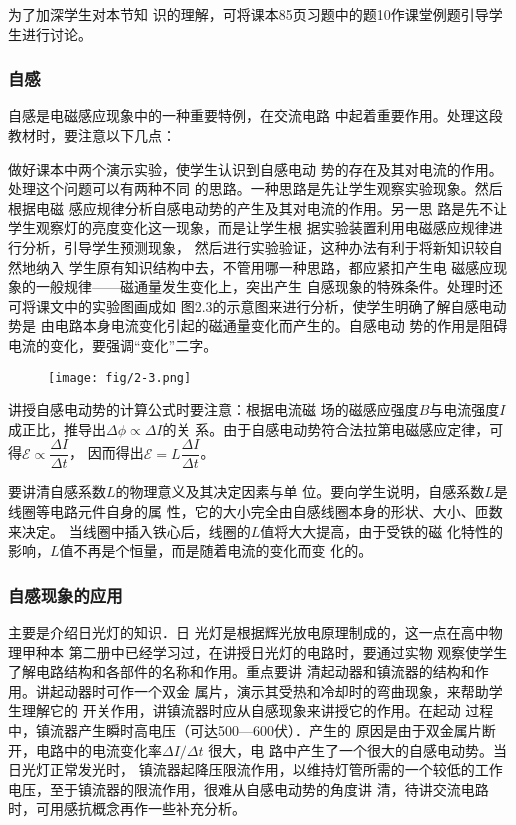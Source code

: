 为了加深学生对本节知
识的理解，可将课本85页习题中的题10作课堂例题引导学
生进行讨论。

\subsubsection{自感}
自感是电磁感应现象中的一种重要特例，在交流电路
中起着重要作用。处理这段教材时，要注意以下几点：

做好课本中两个演示实验，使学生认识到自感电动
势的存在及其对电流的作用。处理这个问题可以有两种不同
的思路。一种思路是先让学生观察实验现象。然后根据电磁
感应规律分析自感电动势的产生及其对电流的作用。另一思
路是先不让学生观察灯的亮度变化这一现象，而是让学生根
据实验装置利用电磁感应规律进行分析，引导学生预测现象，
然后进行实验验证，这种办法有利于将新知识较自然地纳入
学生原有知识结构中去，不管用哪一种思路，都应紧扣产生电
磁感应现象的一般规律——磁通量发生变化上，突出产生
自感现象的特殊条件。处理时还可将课文中的实验图画成如
图2.3的示意图来进行分析，使学生明确了解自感电动势是
由电路本身电流变化引起的磁通量变化而产生的。自感电动
势的作用是阻碍电流的变化，要强调“变化”二字。

\begin{figure}[htp]
    \centering
\texttt{[image: fig/2-3.png]}
    \caption{}
\end{figure}

讲授自感电动势的计算公式时要注意：根据电流磁
场的磁感应强度$B$与电流强度$I$成正比，推导出$\Delta\phi\propto \Delta I$的关
系。由于自感电动势符合法拉第电磁感应定律，可得$\mathcal{E}\propto \dfrac{\Delta I}{\Delta t}$，
因而得出$\mathcal{E}=L\dfrac{\Delta I}{\Delta t}$。

要讲清自感系数$L$的物理意义及其决定因素与单
位。要向学生说明，自感系数$L$是线圈等电路元件自身的属
性，它的大小完全由自感线圈本身的形状、大小、匝数来决定。
当线圈中插入铁心后，线圈的$L$值将大大提高，由于受铁的磁
化特性的影响，$L$值不再是个恒量，而是随着电流的变化而变
化的。

\subsubsection{自感现象的应用}

主要是介绍日光灯的知识．日
光灯是根据辉光放电原理制成的，这一点在高中物理甲种本
第二册中已经学习过，在讲授日光灯的电路时，要通过实物
观察使学生了解电路结构和各部件的名称和作用。重点要讲
清起动器和镇流器的结构和作用。讲起动器时可作一个双金
属片，演示其受热和冷却时的弯曲现象，来帮助学生理解它的
开关作用，讲镇流器时应从自感现象来讲授它的作用。在起动
过程中，镇流器产生瞬时高电压（可达500—600伏）．产生的
原因是由于双金属片断开，电路中的电流变化率$\Delta I/\Delta t$
很大，电
路中产生了一个很大的自感电动势。当日光灯正常发光时，
镇流器起降压限流作用，以维持灯管所需的一个较低的工作
电压，至于镇流器的限流作用，很难从自感电动势的角度讲
清，待讲交流电路时，可用感抗概念再作一些补充分析。


